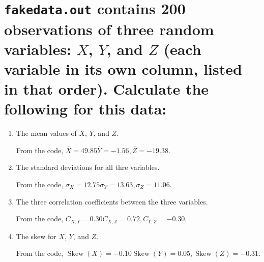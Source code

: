 \section{\texttt{fakedata.out} contains 200 observations of three random variables: $X$, $Y$, and $Z$ (each variable in its own column, listed in that order). Calculate the following for this data:}

\begin{enumerate}
    \item The mean values of $X$, $Y$, and $Z$.

    From the code, $\bar{X} = 49.85 \bar{Y} = -1.56, \bar{Z} = -19.38$.

    \item The standard deviations for all thre variables.

    From the code, $\sigma_{X} = 12.75 \sigma_{Y} = 13.63, \sigma_{Z} = 11.06$.

    \item The three correlation coefficients between the three variables.

    From the code, $C_{X,Y} = 0.30 C_{X,Z} = 0.72, C_{Y,Z} = -0.30$.

    \item The skew for $X$, $Y$, and $Z$.
    
    From the code, $\operatorname{Skew}(X) = -0.10 \operatorname{Skew}(Y) = 0.05, \operatorname{Skew}(Z) = -0.31$.
\end{enumerate}

